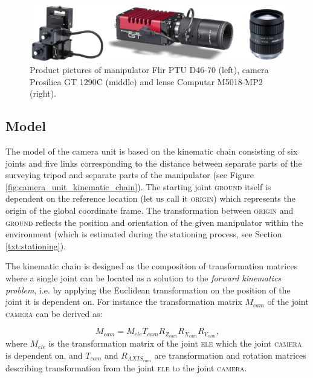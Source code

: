 \begin{figure}[htb]
	\centering
	\includegraphics[width=0.9\linewidth]{fig/prosilica_gt1290c_flir_ptud4670_computar.png}
	\caption{Product pictures of manipulator Flir PTU D46-70 (left), camera Prosilica GT 1290C (middle) and lense Computar M5018-MP2 (right).}
	\label{fig:prosilica_gt1290c_flir_ptud4670}
\end{figure}

\subsection{Model} \label{txt:model}

The model of the camera unit is based on the kinematic chain consisting of six joints and five links corresponding to the distance between separate parts of the surveying tripod and separate parts of the manipulator (see Figure \ref{fig:camera_unit_kinematic_chain}). The starting joint \textsc{ground} itself is dependent on the reference location (let us call it \textsc{origin}) which represents the origin of the global coordinate frame. The transformation between \textsc{origin} and \textsc{ground} reflects the position and orientation of the given manipulator within the environment (which is estimated during the stationing process, see Section \ref{txt:stationing}).

The kinematic chain is designed as the composition of transformation matrices where a single joint can be located as a solution to the \textit{forward kinematics problem}, i.e. by applying the Euclidean transformation on the position of the joint it is dependent on. For instance the transformation matrix $M_{cam}$ of the joint \textsc{camera} can be derived as:

\begin{equation}
M_{cam} = M_{ele}T_{cam}R_{Z_{cam}}R_{X_{cam}}R_{Y_{cam}},
\end{equation}
where $M_{ele}$ is the transformation matrix of the joint \textsc{ele} which the joint \textsc{camera} is dependent on, and $T_{cam}$ and $R_{AXIS_{cam}}$ are transformation and rotation matrices describing transformation from the joint \textsc{ele} to the joint \textsc{camera}. 

